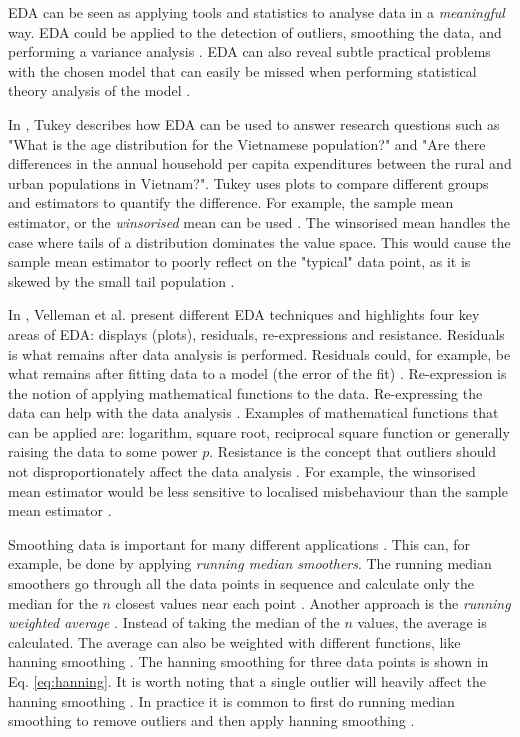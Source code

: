\newpage
EDA can be seen as applying tools and statistics to analyse data in a \emph{meaningful} way.
EDA could be applied to the detection of outliers, smoothing the data, and performing a variance analysis \cite{Anselin1999, Hoaglin2003, Tukey1977, Velleman1981}.
EDA can also reveal subtle practical problems with the chosen model that can easily be missed when performing statistical theory analysis of the model \cite{Gelman2003}.

In \cite{Tukey1977}, Tukey describes how EDA can be used to answer research questions such as "What is the age distribution for the Vietnamese population?" and "Are there differences in
the annual household per capita expenditures between the rural and urban populations in Vietnam?".
Tukey uses plots to compare different groups and estimators to quantify the difference.
For example, the sample mean estimator, or the \emph{winsorised} mean can be used \cite{Tukey1977}.
The winsorised mean handles the case where tails of a distribution dominates the value space.  
This would cause the sample mean estimator to poorly reflect on the "typical" data point, as it is skewed by the small tail population \cite{Tukey1977}.

In \cite{Velleman1981}, Velleman et al. present different EDA techniques and highlights four key areas of EDA: displays (plots), residuals, re-expressions and resistance.
Residuals is what remains after data analysis is performed.
Residuals could, for example, be what remains after fitting data to a model (the error of the fit) \cite{Velleman1981}.
Re-expression is the notion of applying mathematical functions to the data.
Re-expressing the data can help with the data analysis \cite{Hoaglin2003, Velleman1981}.
Examples of mathematical functions that can be applied are: logarithm, square root, reciprocal square function or generally raising the data to some power $p$.
Resistance is the concept that outliers should not disproportionately affect the data analysis \cite{Hoaglin2003, Velleman1981}.
For example, the winsorised mean estimator would be less sensitive to localised misbehaviour than the sample mean estimator \cite{Tukey1977}.

Smoothing data is important for many different applications \cite{Bradley1997, Pang2002, Quinlan1992, Velleman1981}.
This can, for example, be done by applying \emph{running median smoothers}.
The running median smoothers go through all the data points in sequence and calculate only the median for the $n$ closest values near each point \cite{Velleman1981}.
Another approach is the \emph{running weighted average} \cite{Velleman1981}.
Instead of taking the median of the $n$ values, the average is calculated.
The average can also be weighted with different functions, like hanning smoothing \cite{Velleman1981}.
The hanning smoothing for three data points is shown in Eq. \ref{eq:hanning}.
It is worth noting that a single outlier will heavily affect the hanning smoothing \cite{Velleman1981}.
In practice it is common to first do running median smoothing to remove outliers and then apply hanning smoothing \cite{Velleman1981}.

